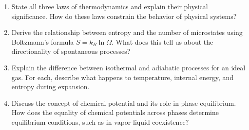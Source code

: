 \documentclass[11pt]{article}
\begin{document}
\begin{enumerate}[label=\textbf{\arabic*.}]
  \item State all three laws of thermodynamics and explain their physical significance. How do 
  these laws constrain the behavior of physical systems?

  \item Derive the relationship between entropy and the number of microstates using Boltzmann's 
  formula $S = k_B \ln \Omega$. What does this tell us about the directionality of spontaneous processes?

  \item Explain the difference between isothermal and adiabatic processes for an ideal gas. For each, 
  describe what happens to temperature, internal energy, and entropy during expansion.

  \item Discuss the concept of chemical potential and its role in phase equilibrium. How does the 
  equality of chemical potentials across phases determine equilibrium conditions, such as in 
  vapor-liquid coexistence?

\end{enumerate}
\end{document}
